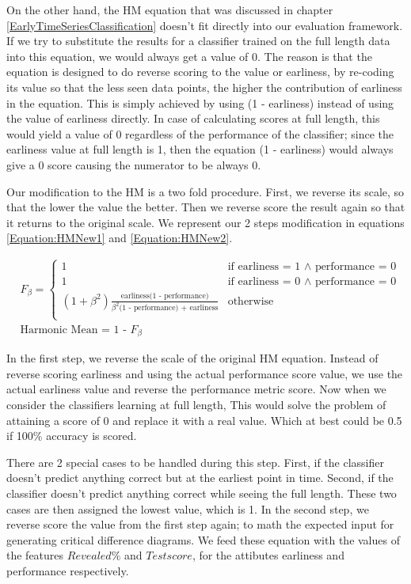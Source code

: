On the other hand, the HM equation that was discussed in chapter \ref{EarlyTimeSeriesClassification} doesn't fit directly into our evaluation framework.
If we try to substitute the results for a classifier trained on the full length data into this equation, we would always get a value of 0.
The reason is that the equation is designed to do reverse scoring to the value or earliness, by re-coding its value so that the less seen data points, the higher the contribution of earliness in the equation.
This is simply achieved by using (1 - earliness) instead of using the value of earliness directly.
In case of calculating scores at full length, this would yield a value of 0 regardless of the performance of the classifier;
since the earliness value at full length is 1, then the equation (1 - earliness) would always give a 0 score causing the numerator to be always 0.

Our modification to the HM is a two fold procedure.
First, we reverse its scale, so that the lower the value the better. Then we reverse score the result again so that it returns to the original scale.
We represent our 2 steps modification in equations \ref{Equation:HMNew1} and \ref{Equation:HMNew2}.

\begin{align}
    & F_{\beta} =
        \begin{cases}
          1 & \text{if earliness = 1 $\land$ performance = 0} \\
          1 & \text{if earliness = 0 $\land$ performance = 0} \\
          (1 + \beta^2)\frac{\text{earliness(1 - performance)}}{\beta^2 \text{(1 - performance) + earliness}} & \text{otherwise} \\
        \end{cases} \label{Equation:HMNew1} \\
    & \text{Harmonic Mean = 1 - } F_{\beta} \label{Equation:HMNew2}
\end{align}

In the first step, we reverse the scale of the original HM equation.
Instead of reverse scoring earliness and using the actual performance score value, we use the actual earliness value and reverse the performance metric score.
Now when we consider the classifiers learning at full length, 
This would solve the problem of attaining a score of 0  and replace it with a real value. Which at best could be 0.5 if 100\% accuracy is scored.

There are 2 special cases to be handled during this step.
First, if the classifier doesn't predict anything correct but at the earliest point in time.
Second, if the classifier doesn't predict anything correct while seeing the full length.
These two cases are then assigned the lowest value, which is 1.
In the second step, we reverse score the value from the first step again; to math the expected input for generating critical difference diagrams.
We feed these equation with the values of the features $Revealed \%$ and $Test score$, for the attibutes earliness and performance respectively.


